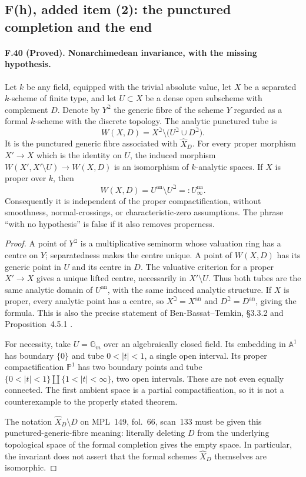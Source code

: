 \subsection{F(h), added item (2): the punctured completion and the end}

\paragraph{F.40 (Proved). Nonarchimedean invariance, with the missing hypothesis.}
Let $k$ be any field, equipped with the trivial absolute value, let $X$ be
a separated $k$-scheme of finite type, and let $U\subset X$ be a dense open
subscheme with complement $D$. Denote by $Y^{\beth}$ the generic fibre of
the scheme $Y$ regarded as a formal $k$-scheme with the discrete topology.
The analytic punctured tube is
\[
 W(X,D)=X^{\beth}\setminus\bigl(U^{\beth}\cup D^{\beth}\bigr).
\]
It is the punctured generic fibre associated with $\widehat X_D$.
For every proper morphism $X'\to X$ which is the identity on $U$, the
induced morphism $W(X',X'\setminus U)\to W(X,D)$ is an isomorphism of
$k$-analytic spaces. If $X$ is proper over $k$, then
\[
                 W(X,D)=U^{\mathrm{an}}\setminus U^{\beth}=:U_\infty^{\mathrm{na}}.
\]
Consequently it is independent of the proper compactification, without
smoothness, normal-crossings, or characteristic-zero assumptions. The
phrase ``with no hypothesis'' is false if it also removes properness.

\begin{proof}
A point of $Y^{\beth}$ is a multiplicative seminorm whose valuation ring
has a centre on $Y$; separatedness makes the centre unique. A point of
$W(X,D)$ has its generic point in $U$ and its centre in $D$. The valuative
criterion for a proper $X'\to X$ gives a unique lifted centre, necessarily
in $X'\setminus U$. Thus both tubes are the same analytic domain of
$U^{\mathrm{an}}$, with the same induced analytic structure. If $X$ is
proper, every analytic point has a centre, so $X^{\beth}=X^{\mathrm{an}}$
and $D^{\beth}=D^{\mathrm{an}}$, giving the formula. This is also the
precise statement of Ben-Bassat--Temkin, \S3.3.2 and Proposition~4.5.1
\cite{BenBassatTemkin2012}.

For necessity, take $U=\mathbb G_m$ over an algebraically closed field.
Its embedding in $\mathbb A^1$ has boundary $\{0\}$ and tube
$0<|t|<1$, a single open interval. Its proper compactification
$\mathbb P^1$ has two boundary points and tube
$\{0<|t|<1\}\amalg\{1<|t|<\infty\}$, two open intervals. These are not
even equally connected. The first ambient space is a partial
compactification, so it is not a counterexample to the properly stated
theorem.

The notation $\widehat X_D\setminus D$ on MPL~149, fol.~66, scan~133
must be given this punctured-generic-fibre meaning: literally deleting
$D$ from the underlying topological space of the formal completion gives
the empty space. In particular, the invariant does not assert that the
formal schemes $\widehat X_D$ themselves are isomorphic.
\end{proof}


